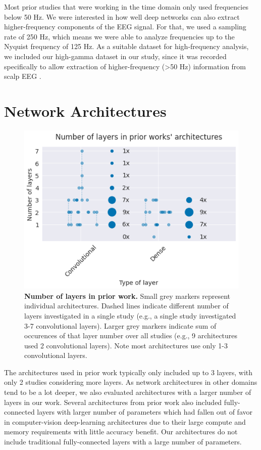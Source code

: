 Most prior studies that were working in the time domain only used
frequencies below 50 Hz. We were interested in how well deep networks
can also extract higher-frequency components of the EEG
signal. For that, we used a sampling rate of 250 Hz, which means we were
able to analyze frequencies up to the Nyquist frequency of 125 Hz. As a
suitable dataset for high-frequency analysis, we
included our high-gamma dataset in our study, since it was recorded
specifically to allow extraction of higher-frequency (\textgreater50 Hz)
information from scalp EEG \citep{schirrmeisterdeephbm2017}.


\section{Network Architectures}\label{network-architectures}

    

\begin{figure}[th]
    \myfloatalign
    \includegraphics[width=0.9\linewidth]{latex_images/PriorWork_files/PriorWork_11_0.png}
    \caption[Number of layers in prior work.]{
\textbf{Number of layers in prior work.} Small grey markers represent
individual architectures. Dashed lines indicate different number of
layers investigated in a single study (e.g., a single study investigated
3-7 convolutional layers). Larger grey markers indicate sum of
occurences of that layer number over all studies (e.g., 9 architectures
used 2 convolutional layers). Note most architectures use only 1-3
convolutional layers.}\label{layernum_fig}
\end{figure}

    The architectures used in prior work typically only included up to 3
layers, with only 2 studies considering more layers. As network
architectures in other domains tend to be a lot deeper, we also
evaluated architectures with a larger number of layers in our work.
Several architectures from prior work also included fully-connected
layers with larger number of parameters which had fallen out of favor in
computer-vision deep-learning architectures due to their large compute
and memory requirements with little accuracy benefit. Our architectures
do not include traditional fully-connected layers with a large number of
parameters.



